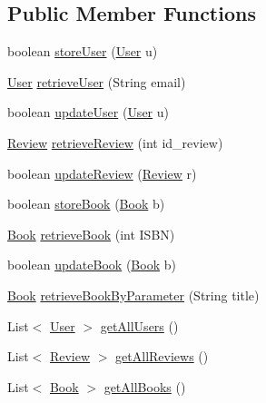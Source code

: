 \subsection*{Public Member Functions}
\begin{DoxyCompactItemize}
\item 
boolean \hyperlink{interfacedb_1_1_i_d_a_o_a5b1f408c9a25305e977e962faa38b026}{store\+User} (\hyperlink{classserver_1_1data_1_1_user}{User} u)
\item 
\hyperlink{classserver_1_1data_1_1_user}{User} \hyperlink{interfacedb_1_1_i_d_a_o_ad00bb5255d0badadbf5244799c3b708f}{retrieve\+User} (String email)
\item 
boolean \hyperlink{interfacedb_1_1_i_d_a_o_adbc5f00b7bcdffb6692367a3c9564193}{update\+User} (\hyperlink{classserver_1_1data_1_1_user}{User} u)
\item 
\hyperlink{classserver_1_1data_1_1_review}{Review} \hyperlink{interfacedb_1_1_i_d_a_o_a53fd20610d94f7c5f0f713dad7528c26}{retrieve\+Review} (int id\+\_\+review)
\item 
boolean \hyperlink{interfacedb_1_1_i_d_a_o_a7288e76ee3ce667c0d0d7ecaeef0d94e}{update\+Review} (\hyperlink{classserver_1_1data_1_1_review}{Review} r)
\item 
boolean \hyperlink{interfacedb_1_1_i_d_a_o_a39851dc1e1f05af40afeb76a5f8be99a}{store\+Book} (\hyperlink{classserver_1_1data_1_1_book}{Book} b)
\item 
\hyperlink{classserver_1_1data_1_1_book}{Book} \hyperlink{interfacedb_1_1_i_d_a_o_a1457ecf91799eaacd17cd3259826fc36}{retrieve\+Book} (int I\+S\+BN)
\item 
boolean \hyperlink{interfacedb_1_1_i_d_a_o_a202354d7a3e1231687d543e82c15a6f5}{update\+Book} (\hyperlink{classserver_1_1data_1_1_book}{Book} b)
\item 
\hyperlink{classserver_1_1data_1_1_book}{Book} \hyperlink{interfacedb_1_1_i_d_a_o_a4c5eda35bfbba1b0a994efe00f99a544}{retrieve\+Book\+By\+Parameter} (String title)
\item 
List$<$ \hyperlink{classserver_1_1data_1_1_user}{User} $>$ \hyperlink{interfacedb_1_1_i_d_a_o_a88b60729d9517ca9aa31b7db7ae07aee}{get\+All\+Users} ()
\item 
List$<$ \hyperlink{classserver_1_1data_1_1_review}{Review} $>$ \hyperlink{interfacedb_1_1_i_d_a_o_a3d9625d7e5426aad3c2e70fd0174e5f0}{get\+All\+Reviews} ()
\item 
List$<$ \hyperlink{classserver_1_1data_1_1_book}{Book} $>$ \hyperlink{interfacedb_1_1_i_d_a_o_a75a5ebcd7c3421ae7cccc8e2f3b2d9f9}{get\+All\+Books} ()
\end{DoxyCompactItemize}



